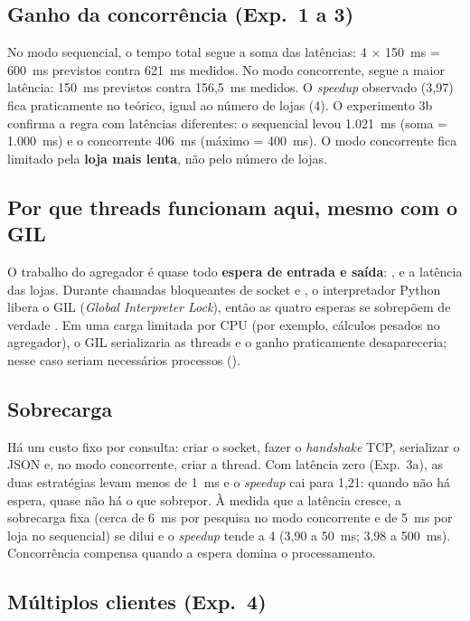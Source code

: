 \subsection{Ganho da concorrência (Exp.~1 a 3)}

No modo sequencial, o tempo total segue a soma das latências: 4 × 150~ms = 600~ms previstos contra 621~ms medidos. No modo concorrente, segue a maior latência: 150~ms previstos contra 156,5~ms medidos. O \textit{speedup} observado (3,97) fica praticamente no teórico, igual ao número de lojas (4). O experimento 3b confirma a regra com latências diferentes: o sequencial levou 1.021~ms (soma = 1.000~ms) e o concorrente 406~ms (máximo = 400~ms). O modo concorrente fica limitado pela \textbf{loja mais lenta}, não pelo número de lojas.

\subsection{Por que threads funcionam aqui, mesmo com o GIL}

O trabalho do agregador é quase todo \textbf{espera de entrada e saída}: ,  e a latência das lojas. Durante chamadas bloqueantes de socket e , o interpretador Python libera o GIL (\textit{Global Interpreter Lock}), então as quatro esperas se sobrepõem de verdade \cite{python-threading}. Em uma carga limitada por CPU (por exemplo, cálculos pesados no agregador), o GIL serializaria as threads e o ganho praticamente desapareceria; nesse caso seriam necessários processos ().

\subsection{Sobrecarga}

Há um custo fixo por consulta: criar o socket, fazer o \textit{handshake} TCP, serializar o JSON e, no modo concorrente, criar a thread. Com latência zero (Exp.~3a), as duas estratégias levam menos de 1~ms e o \textit{speedup} cai para 1,21: quando não há espera, quase não há o que sobrepor. À medida que a latência cresce, a sobrecarga fixa (cerca de 6~ms por pesquisa no modo concorrente e de 5~ms por loja no sequencial) se dilui e o \textit{speedup} tende a 4 (3,90 a 50~ms; 3,98 a 500~ms). Concorrência compensa quando a espera domina o processamento.

\subsection{Múltiplos clientes (Exp.~4)}

